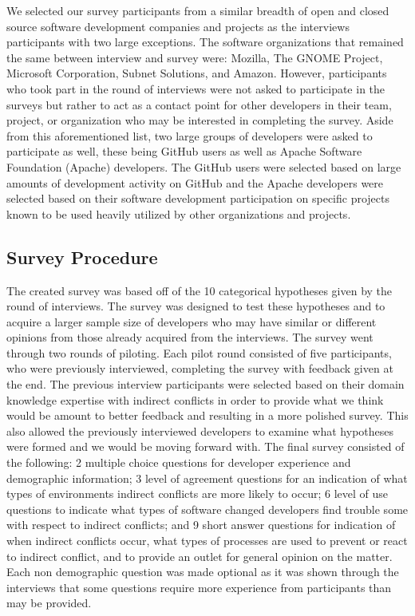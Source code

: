 \documentclass[conference]{IEEEtran}
\newcommand{\totalCategories}{10}
\begin{document}
We selected our survey participants from a similar breadth of open and closed source software development 
companies and projects as the interviews participants with two large exceptions. The software organizations
that remained the same between interview and survey were: Mozilla, The GNOME Project, Microsoft Corporation, 
Subnet Solutions, and Amazon.
However, participants who took part in the round of interviews were not asked to participate in the surveys but
rather to act as a contact point for other developers in their team, project, or organization who may be interested
in completing the survey. Aside from this aforementioned list, two large groups of developers were asked to
participate as well, these being GitHub users as well as Apache Software Foundation (Apache) developers. The GitHub
users were selected based on large amounts of development activity on GitHub and the Apache developers
were selected based on their software development participation on specific projects known to be used heavily
utilized by other organizations and projects.

\subsection{Survey Procedure}

The created survey was based off of the \totalCategories{} categorical hypotheses given by the round of interviews. The survey
was designed to test these hypotheses and to acquire a larger sample size of developers who may have similar
or different opinions from those already acquired from the interviews. The survey went through two rounds of
piloting. Each pilot round consisted of five participants, who were previously interviewed, completing the survey
with feedback given at the end. The previous interview participants were selected based on their domain knowledge
expertise with indirect conflicts in order to provide what we think would be amount to better feedback and resulting
in a more polished survey. This also allowed the previously interviewed developers to examine what hypotheses were
formed and we would be moving forward with. The final survey consisted of the following:
2 multiple choice questions for developer experience and demographic information; 3 level of agreement questions for an indication of
what types of environments indirect conflicts are more likely to occur;
6 level of use questions to indicate what types of software changed developers find trouble some with respect to
indirect conflicts; and 9 short answer questions for indication of when indirect conflicts occur, what types of
processes are used to prevent or react to indirect conflict, and to provide an outlet for general opinion
on the matter. Each non demographic question was made optional as it was shown 
through the interviews that some questions require more experience from participants than may be provided.
\end{document}
